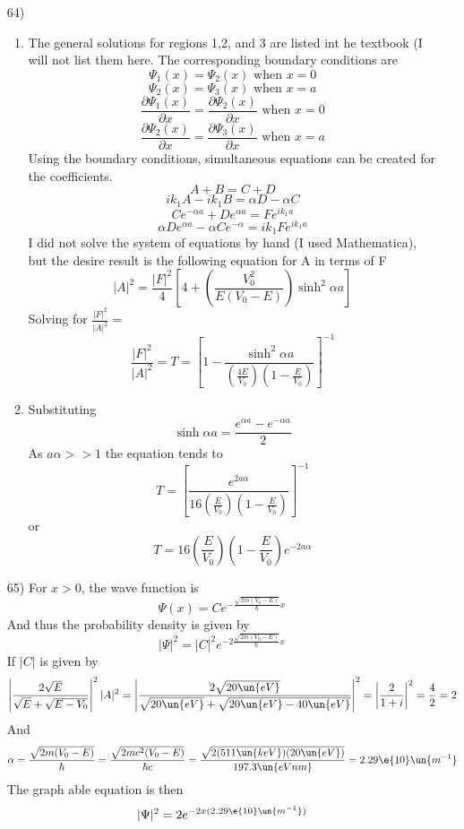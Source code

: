 \documentclass[12pt]{2620hw}
\begin{document}
\begin{enumerate}
\begin{enumerate}
\end{enumerate}
\item [64)] 
\begin{enumerate}
    \item The general solutions for regions 1,2, and 3 are listed int he textbook (I will not list them here. The corresponding boundary conditions are 
	\[
		\Psi_1(x) = \Psi_2(x) \text{ when } x=0	
	\]
	\[
		\Psi_2(x) = \Psi_3(x) \text{ when } x=a	
	\]
	\[
		\frac{\partial \Psi_1(x)}{\partial x} = \frac{\partial \Psi_2(x)}{\partial x} \text{ when } x= 0
	\] 
	\[
		\frac{\partial \Psi_2(x)}{\partial x} = \frac{\partial \Psi_3(x)}{\partial x} \text{ when } x=a
	\]
	Using the boundary conditions, simultaneous equations can be created for the coefficients.
	\[
		A+B = C+D	
	\]
	\[
		ik_1A - ik_1B = \alpha D - \alpha C	
	\]
	\[
		Ce^{-\alpha a} + De^{\alpha a} = Fe^{ik_1 a}
	\]
	\[
		\alpha D e^{\alpha a} - \alpha C e^{-\alpha} = ik_1 Fe^{ik_1 a}
	\]
	I did not solve the system of equations by hand (I used Mathematica), but the desire result is the following equation for A in terms of F
	\[
		|A|^2 = \frac{|F|^2}{4} \left[ 4 + \left( \frac{V_0^2}{E(V_0-E)} \right)\sinh^2 \alpha a \right]
	\]
	Solving for $\frac{|F|^2}{|A|^2} = $
	\[
		\frac{|F|^2}{|A|^2} = T = \left[ 1 - \frac{\sinh^2 \alpha a}{\left( \frac{4E}{V_0} \right) \left( 1 - \frac{E}{V_0} \right)} \right]^{-1}	
	\]

	\item Substituting 
		\[
			\sinh \alpha a = \frac{e^{\alpha a} - e^{-\alpha a}}{2}
		\]
		As $a\alpha >> 1$ the equation tends to 
		\[
			T = \left[ \frac{e^{2a\alpha}}{16 \left( \frac{E}{V_0} \right) \left( 1 - \frac{E}{V_0}\right)}  \right]^{-1}
		\]
		or 
		\[
			T = 16 \left( \frac{E}{V_0} \right) \left( 1 - \frac{E}{V_0} \right)e^{-2 a \alpha}
		\]
\end{enumerate}

\item [65)] For $x > 0$, the wave function is
\[
	\Psi(x) = Ce^{-\frac{\sqrt{2m(V_0-E)}}{\hbar}x}
\]
And thus the probability density is given by 
\[
	| \Psi |^2 = |C|^2e^{-2\frac{\sqrt{2m(V_0-E)}}{\hbar}x}
\]
If $|C|$ is given by 
\[
	\left| \frac{2\sqrt{E}}{\sqrt{E} + \sqrt{E - V_0}} \right|^2 |A|^2= 	\left| \frac{2\sqrt{20\un{eV}}}{\sqrt{20\un{eV}} + \sqrt{20\un{eV} - 40\un{eV}}} \right|^2 = \left|\frac{2}{1+i} \right|^2 = \frac{4}{2} = 2
\]
And
\[
		\alpha  = \frac{\sqrt{ 2m(V_0 - E)}}{\hbar} = \frac{\sqrt{2mc^2(V_0-E)}}{\hbar c} = \frac{\sqrt{2(511\un{keV})(20\un{eV})}}{197.3\un{eVnm}} = 2.29\e{10}\un{m^{-1}}
\]
The graph able equation is then
\[
	|\Psi|^2  = 2e^{-2x(2.29\e{10}\un{m^{-1}})}
\]

\begin{figure}[h!]
\begin{center}
\end{center}
\end{figure}

\end{enumerate}
\end{document}
